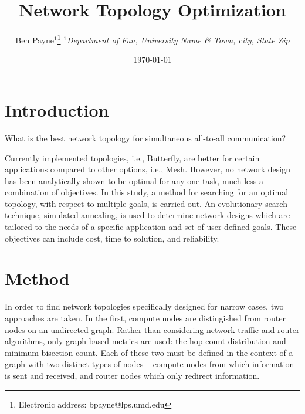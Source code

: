\documentclass[pdftex]{article}
\begin{document}
\title{Network Topology Optimization}

\author{Ben Payne$^{1}$\footnote{Electronic address: bpayne@lps.umd.edu}
{\it $^{1}$Department of Fun, University Name \& Town, city, State Zip}}

\date{\today}



\tableofcontents


\section{Introduction}

What is the best network topology for simultaneous all-to-all communication?

Currently implemented topologies, i.e., Butterfly, are better for certain applications compared to other options, i.e., Mesh. However, no network design has been analytically shown to be optimal for any one task, much less a combination of objectives. In this study, a method for searching for an optimal topology, with respect to multiple goals, is carried out. An evolutionary search technique, simulated annealing, is used to determine network designs which are tailored to the needs of a specific application and set of user-defined goals. These objectives can include cost, time to solution, and reliability.

\section{Method}

In order to find network topologies specifically designed for narrow cases, two approaches are taken. In the first, compute nodes are distingished from router nodes on an undirected graph. Rather than considering network traffic and router algorithms, only graph-based metrics are used: the hop count distribution and minimum bisection count. Each of these two must be defined in the context of a graph with two distinct types of nodes -- compute nodes from which information is sent and received, and router nodes which only redirect information. 
\end{document}
